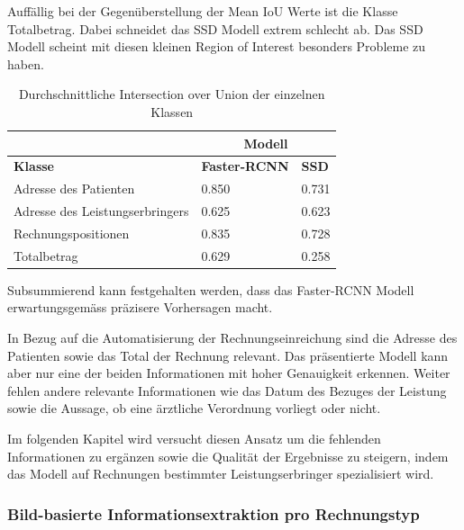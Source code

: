 Auffällig bei der Gegenüberstellung der Mean IoU Werte ist die Klasse Totalbetrag. Dabei schneidet das SSD Modell extrem schlecht ab. Das SSD Modell scheint mit diesen kleinen Region of Interest besonders Probleme zu haben.

\begin{table}[h!]
    \centering
    \captionsetup{width=.9\linewidth}
    \caption{Durchschnittliche Intersection over Union der einzelnen Klassen}
    \label{tab:3ap-iou}
    \begin{tabular}{|l|l|l|}
    \hhline{~|--|}    
    \multicolumn{1}{c|}{}
                                    & \multicolumn{2}{c|}{\cellcolor[HTML]{C0E5FD}\textbf{Modell}}  \\
    \hline
    \rowcolor[HTML]{C0E5FD}
    \textbf{Klasse}                 & \textbf{Faster-RCNN} & \textbf{SSD}           \\
    \hline
    Adresse des Patienten           & 0.850       & 0.731         \\
    \hline
    Adresse des Leistungserbringers & 0.625       & 0.623         \\
    \hline
    Rechnungspositionen             & 0.835       & 0.728         \\
    \hline
    Totalbetrag                     & 0.629       & 0.258         \\  
    \hline
    \end{tabular}
\end{table}

Subsummierend kann festgehalten werden, dass das Faster-RCNN Modell erwartungsgemäss präzisere Vorhersagen macht. 

In Bezug auf die Automatisierung der Rechnungseinreichung sind die Adresse des Patienten sowie das Total der Rechnung relevant. Das präsentierte Modell kann aber nur eine der beiden Informationen mit hoher Genauigkeit erkennen. Weiter fehlen andere relevante Informationen wie das Datum des Bezuges der Leistung sowie die Aussage, ob eine ärztliche Verordnung vorliegt oder nicht. 

Im folgenden Kapitel wird versucht diesen Ansatz um die fehlenden Informationen zu ergänzen sowie die Qualität der Ergebnisse zu steigern, indem das Modell auf Rechnungen bestimmter Leistungserbringer spezialisiert wird.

\subsubsection{Bild-basierte Informationsextraktion pro Rechnungstyp}
\label{chap:lerb-specific-ie}

